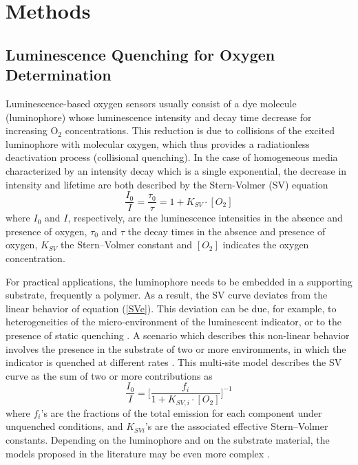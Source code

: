 \documentclass[9pt,twocolumn,twoside,pdftex]{optica}
\begin{document}
\section{Methods}
\label{sec:methods}

\subsection{Luminescence Quenching for Oxygen Determination}
\label{Theory}

Luminescence-based oxygen sensors usually consist of a dye molecule (luminophore) whose luminescence intensity and decay time decrease for increasing O$_2$ concentrations. This reduction is due to collisions of the excited luminophore with molecular oxygen, which thus provides a radiationless deactivation process (collisional quenching). 
In the case of homogeneous media characterized by an intensity decay which is a single exponential, the decrease in intensity and lifetime are both described by the Stern-Volmer (SV) equation \cite{Lakowicz2006}
\begin{equation}
\frac{I_0}{I}=\frac{\tau_0}{\tau}=1+K_{SV} \cdot \left[O_2\right]
\label{SVe}
\end{equation}
where $I_0$ and $I$, respectively, are the luminescence intensities in the absence and presence of oxygen, $\tau_0$ and $\tau$ the decay times in the absence and presence of oxygen, $K_{SV}$ the Stern–Volmer constant and $\left[O_2\right]$ indicates the oxygen concentration.

For practical applications, the luminophore needs to be embedded in a supporting substrate, frequently a polymer. As a result, the SV curve deviates from the linear behavior of equation (\ref{SVe}). This deviation can be due, for example, to heterogeneities of the micro-environment of the luminescent indicator, or to the presence of static quenching \cite{Wang2014}. A scenario which describes this non-linear behavior involves the presence in the substrate of two or more environments, in which the indicator is quenched at different rates \cite{Carraway1991,Demas1995}. This multi-site model describes the SV curve as the sum of two or more contributions as
\begin{equation}
\frac{I_0}{I}=\bigg[
\frac{f_i}{1+K_{SV,i} \cdot \left[O_2\right]}
\bigg]^{-1}
\label{SVe2}
\end{equation}
where $f_i$'s are the fractions of the total emission for each component under unquenched conditions, and $K_{SVi}$'s are the associated effective Stern–Volmer constants. Depending on the luminophore and on the substrate material, the models proposed in the literature may be even more complex \cite{Demas1995,Hartmann1995,Mills1999}.
\end{document}
